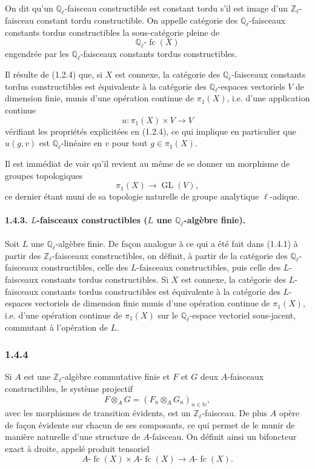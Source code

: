 \documentclass[11pt]{article}
\providecommand{\GL}{\operatorname{GL}}
\providecommand{\fc}{\operatorname{fc}}
\begin{document}
On dit qu'un \(\mathbb Q_\ell\)-faisceau constructible est constant tordu s'il est image d'un \(\mathbb Z_\ell\)-faisceau constant tordu constructible. On appelle catégorie des \(\mathbb Q_\ell\)-faisceaux constants tordus constructibles la sous-catégorie pleine de
\[
\mathbb Q_\ell\text{-}\fc(X)
\]
engendrée par les \(\mathbb Q_\ell\)-faisceaux constants tordus constructibles.

Il résulte de (1.2.4) que, si \(X\) est connexe, la catégorie des \(\mathbb Q_\ell\)-faisceaux constants tordus constructibles est équivalente à la catégorie des \(\mathbb Q_\ell\)-espaces vectoriels \(V\) de dimension finie, munis d'une opération continue de \(\pi_1(X)\), i.e. d'une application continue
\[
u:\pi_1(X)\times V\longrightarrow V
\]
vérifiant les propriétés explicitées en (1.2.4), ce qui implique en particulier que \(u(g,v)\) est \(\mathbb Q_\ell\)-linéaire en \(v\) pour tout \(g\in\pi_1(X)\).

Il est immédiat de voir qu'il revient au même de se donner un morphisme de groupes topologiques
\[
\pi_1(X)\longrightarrow \GL(V),
\]
ce dernier étant muni de sa topologie naturelle de groupe analytique \(\ell\)-adique.

\paragraph{1.4.3. \(L\)-faisceaux constructibles (\(L\) une \(\mathbb Q_\ell\)-algèbre finie).}
Soit \(L\) une \(\mathbb Q_\ell\)-algèbre finie. De façon analogue à ce qui a été fait dans (1.4.1) à partir des \(\mathbb Z_\ell\)-faisceaux constructibles, on définit, à partir de la catégorie des \(\mathbb Q_\ell\)-faisceaux constructibles, celle des \(L\)-faisceaux constructibles, puis celle des \(L\)-faisceaux constants tordus constructibles. Si \(X\) est connexe, la catégorie des \(L\)-faisceaux constants tordus constructibles est équivalente à la catégorie des \(L\)-espaces vectoriels de dimension finie munis d'une opération continue de \(\pi_1(X)\), i.e. d'une opération continue de \(\pi_1(X)\) sur le \(\mathbb Q_\ell\)-espace vectoriel sous-jacent, commutant à l'opération de \(L\).

\subsubsection*{1.4.4}
Si \(A\) est une \(\mathbb Z_\ell\)-algèbre commutative finie et \(F\) et \(G\) deux \(A\)-faisceaux constructibles, le système projectif
\[
F\otimes_A G=(F_n\otimes_A G_n)_{n\in\mathbb N},
\]
avec les morphismes de transition évidents, est un \(\mathbb Z_\ell\)-faisceau. De plus \(A\) opère de façon évidente sur chacun de ses composants, ce qui permet de le munir de manière naturelle d'une structure de \(A\)-faisceau. On définit ainsi un bifoncteur exact à droite, appelé produit tensoriel
\[
A\text{-}\fc(X)\times A\text{-}\fc(X)\longrightarrow A\text{-}\fc(X).
\]
\end{document}
